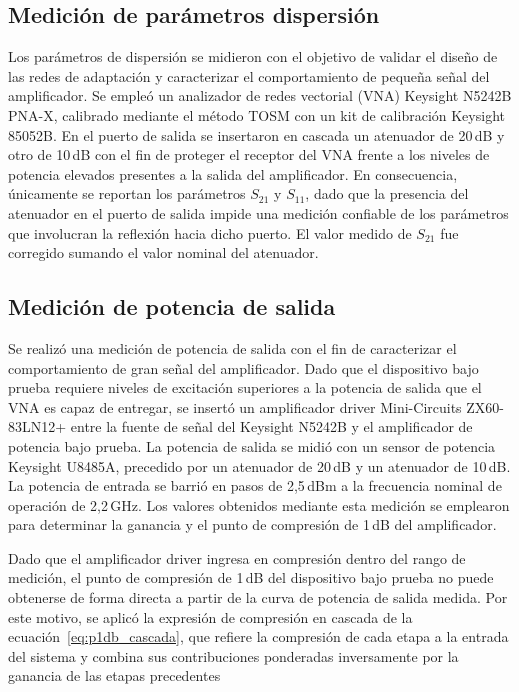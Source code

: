 \subsection{Medición de parámetros dispersión}
Los parámetros de dispersión se midieron con el objetivo de validar el diseño de las redes de adaptación y caracterizar el comportamiento de pequeña señal del amplificador. Se empleó un analizador de redes vectorial (VNA) Keysight N5242B PNA-X, calibrado mediante el método TOSM con un kit de calibración Keysight 85052B. En el puerto de salida se insertaron en cascada un atenuador de 20\,dB y otro de 10\,dB con el fin de proteger el receptor del VNA frente a los niveles de potencia elevados presentes a la salida del amplificador. En consecuencia, únicamente se reportan los parámetros $S_{21}$ y $S_{11}$, dado que la presencia del atenuador en el puerto de salida impide una medición confiable de los parámetros que involucran la reflexión hacia dicho puerto. El valor medido de $S_{21}$ fue corregido sumando el valor nominal del atenuador.

\subsection{Medición de potencia de salida}
Se realizó una medición de potencia de salida con el fin de caracterizar el comportamiento de gran señal del amplificador. Dado que el dispositivo bajo prueba requiere niveles de excitación superiores a la potencia de salida que el VNA es capaz de entregar, se insertó un amplificador driver Mini-Circuits ZX60-83LN12+ entre la fuente de señal del Keysight N5242B y el amplificador de potencia bajo prueba. La potencia de salida se midió con un sensor de potencia Keysight U8485A, precedido por un atenuador de 20\,dB y un atenuador de 10\,dB. La potencia de entrada se barrió en pasos de 2,5\,dBm a la frecuencia nominal de operación de 2,2\,GHz. Los valores obtenidos mediante esta medición se emplearon para determinar la ganancia y el punto de compresión de 1\,dB del amplificador.

Dado que el amplificador driver ingresa en compresión dentro del rango de medición, el punto de compresión de 1\,dB del dispositivo bajo prueba no puede obtenerse de forma directa a partir de la curva de potencia de salida medida. Por este motivo, se aplicó la expresión de compresión en cascada de la ecuación~\eqref{eq:p1db_cascada}, que refiere la compresión de cada etapa a la entrada del sistema y combina sus contribuciones ponderadas inversamente por la ganancia de las etapas precedentes

